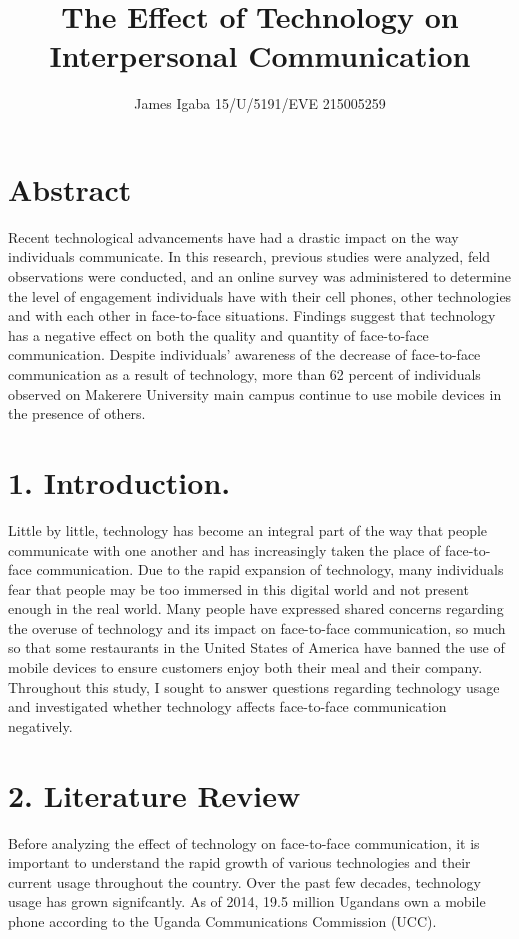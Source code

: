 \documentclass[11pt]{article} %
\title{The Effect of Technology on Interpersonal Communication}
\author{James Igaba 15/U/5191/EVE 215005259}
\begin{document}
\maketitle

\section{Abstract }

Recent technological advancements have had a drastic impact on the way individuals communicate. In this research, previous studies were analyzed, feld observations were conducted, and an online survey was administered to determine the level of engagement individuals have with their cell phones, other technologies and with each other in face-to-face situations. Findings suggest that technology has a negative effect on both the quality and quantity of face-to-face communication. Despite individuals’ awareness of the decrease of face-to-face communication as a result of technology, more than 62 percent of individuals observed on Makerere University main campus continue to use mobile devices in the presence of others. 

\section{1. Introduction.}

Little by little, technology has become an integral part of the way that people communicate with one another and has increasingly taken the place of face-to-face communication. Due to the rapid expansion of technology, many individuals fear that people may be too immersed in this digital world and not present enough in the real world.
Many people have expressed shared concerns regarding the overuse of technology and its impact on face-to-face communication, so much so that some restaurants in the United States of America have banned the use of mobile devices to ensure customers enjoy both their meal and their company.
Throughout this study, I sought to answer questions regarding technology usage and investigated whether technology affects face-to-face communication negatively. 

\section{2. Literature Review}

Before analyzing the effect of technology on face-to-face communication, it is important to understand the rapid growth of various technologies and their current usage throughout the country. Over the past few decades, technology usage has grown signifcantly. As of 2014, 19.5 million Ugandans own a mobile phone according to the Uganda Communications Commission (UCC).
\end{document}
